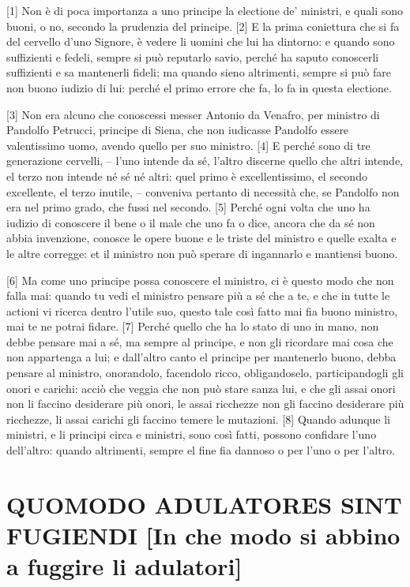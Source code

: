 {[}1{]} Non è di poca importanza a uno principe la electione de'
ministri, e quali sono buoni, o no, secondo la prudenzia del principe.
{[}2{]} E la prima coniettura che si fa del cervello d'uno Signore, è
vedere li uomini che lui ha dintorno: e quando sono suffizienti e
fedeli, sempre si può reputarlo savio, perché ha saputo conoscerli
suffizienti e sa mantenerli fideli; ma quando sieno altrimenti, sempre
si può fare non buono iudizio di lui: perché el primo errore che fa, lo
fa in questa electione.

{[}3{]} Non era alcuno che conoscessi messer Antonio da Venafro, per
ministro di Pandolfo Petrucci, principe di Siena, che non iudicasse
Pandolfo essere valentissimo uomo, avendo quello per suo ministro.
{[}4{]} E perché sono di tre generazione cervelli, -- l'uno intende da
sé, l'altro discerne quello che altri intende, el terzo non intende né
sé né altri: quel primo è excellentissimo, el secondo excellente, el
terzo inutile, -- conveniva pertanto di necessità che, se Pandolfo non
era nel primo grado, che fussi nel secondo.
{[}5{]} Perché ogni volta che uno ha iudizio di conoscere il bene o il
male che uno fa o dice, ancora che da sé non abbia invenzione, conosce
le opere buone e le triste del ministro e quelle exalta e le altre
corregge: et il ministro non può sperare di ingannarlo e mantiensi
buono.

\quebra

{[}6{]} Ma come uno principe possa conoscere el ministro, ci è questo
modo che non falla mai: quando tu vedi el ministro pensare più a sé che
a te, e che in tutte le actioni vi ricerca dentro l'utile suo, questo
tale così fatto mai fia buono ministro, mai te ne potrai fidare. {[}7{]}
Perché quello che ha lo stato di uno in mano, non debbe pensare mai a
sé, ma sempre al principe, e non gli ricordare mai cosa che non
appartenga a lui; e dall'altro canto el principe per mantenerlo buono,
debba pensare al ministro, onorandolo, facendolo ricco, obligandoselo,
participandogli gli onori e carichi: acciò che veggia che non può stare
sanza lui, e che gli assai onori non li faccino desiderare più onori, le
assai ricchezze non gli faccino desiderare più ricchezze, li assai
carichi gli faccino temere le mutazioni. {[}8{]} Quando adunque li
ministri, e li principi circa e ministri, sono così fatti, possono
confidare l'uno dell'altro: quando altrimenti, sempre el fine fia
dannoso o per l'uno o per l'altro.

\quebra\section{QUOMODO ADULATORES SINT FUGIENDI\break
{[}In che modo si abbino a fuggire li adulatori{]}}

